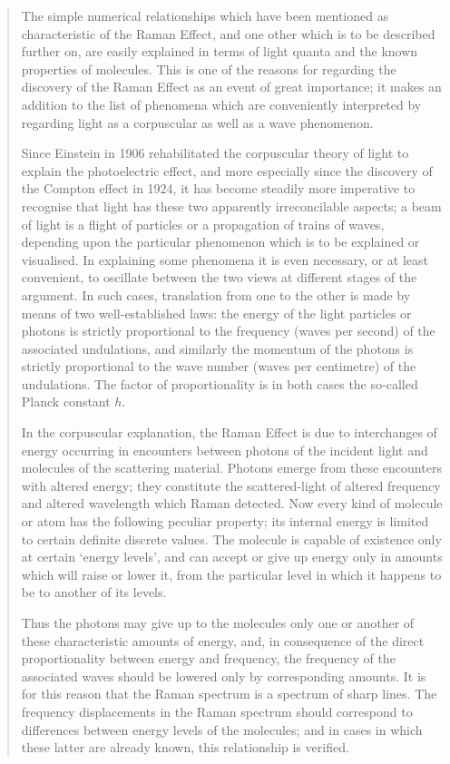 \begin{quote}
{The simple numerical relationships which have been mentioned as characteristic of the Raman Effect, and one other which is to be described further on, are easily explained in terms of light quanta and the known properties of molecules. This is one of the reasons for regarding the discovery of the Raman Effect as an event of great importance; it makes an addition to the list of phenomena which are conveniently interpreted by regarding light as a corpuscular as well as a wave phenomenon.


Since Einstein in 1906 rehabilitated the corpuscular theory of light to explain the photoelectric effect, and more especially since the discovery of the Compton effect in 1924, it has become steadily more imperative to recognise that light has these two apparently irreconcilable aspects; a beam of light is a flight of particles or a propagation of trains of waves, depending upon the particular phenomenon which is to be explained or visualised. In explaining some phenomena it is even necessary, or at least convenient, to oscillate between the two views at different stages of the argument. In such cases, translation from one to the other is made by means of two well-established laws: the energy of the light particles or photons is strictly proportional to the frequency (waves per second) of the associated undulations, and similarly the momentum of the photons is strictly proportional to the wave number (waves per centimetre) of the undulations. The factor of proportionality is in both cases the so-called Planck constant $h$.


In the corpuscular explanation, the Raman Effect is due to interchanges of energy occurring in encounters between photons of the incident light and molecules of the scattering material. Photons emerge from these encounters with altered energy; they constitute the scattered-light of altered frequency and altered wavelength which Raman detected. Now every kind of molecule or atom has the following peculiar property; its internal energy is limited to certain definite discrete values. The molecule is capable of existence only at certain `energy levels', and can accept or give up energy only in amounts which will raise or lower it, from the particular level in which it happens to be to another of its levels.

Thus the photons may give up to the molecules only one or another of these characteristic amounts of energy, and, in
consequence of the direct proportionality between energy and frequency, the frequency of the associated waves should be lowered only by corresponding amounts. It is for this reason that the Raman spectrum is a spectrum of sharp lines. The frequency displacements in the Raman spectrum should correspond to differences between energy levels of the molecules; and in cases in which these latter are already known, this relationship is verified.

}
\end{quote}
